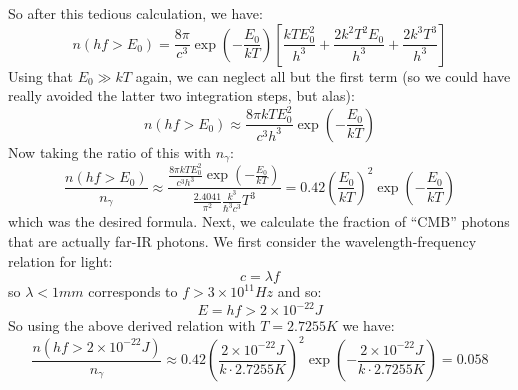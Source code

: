 So after this tedious calculation, we have:
\begin{equation}
  n(hf > E_0) = \frac{8\pi}{c^3}\exp(-\frac{E_0}{kT})\left[\frac{kTE_0^2}{h^3} + \frac{2k^2T^2E_0}{h^3} + \frac{2k^3T^3}{h^3}\right]
\end{equation}
Using that $E_0 \gg kT$ again, we can neglect all but the first term (so we could have really avoided the latter two integration steps, but alas):
\begin{equation}
  n(hf > E_0) \approx \frac{8\pi kTE_0^2}{c^3h^3}\exp(-\frac{E_0}{kT})
\end{equation}
Now taking the ratio of this with $n_\gamma$:
\begin{equation}
  \boxed{\frac{n(hf > E_0)}{n_\gamma} \approx \frac{\frac{8\pi kTE_0^2}{c^3h^3}\exp(-\frac{E_0}{kT})}{\frac{2.4041}{\pi^2}\frac{k^3}{\hbar^3c^3}T^3} = 0.42\left(\frac{E_0}{kT}\right)^2\exp(-\frac{E_0}{kT})}
\end{equation}
which was the desired formula. Next, we calculate the fraction of ``CMB'' photons that are actually far-IR photons. We first consider the wavelength-frequency relation for light:
\begin{equation}
  c = \lambda f
\end{equation}
so $\lambda < 1\si{mm}$ corresponds to $f > 3 \times 10^{11}\si{Hz}$ and so:
\begin{equation}
  E = hf > 2 \times 10^{-22}\si{J}
\end{equation}
So using the above derived relation with $T = 2.7255\si{K}$ we have:
\begin{equation}
  \boxed{\frac{n(hf > 2 \times 10^{-22}\si{J})}{n_\gamma} \approx 0.42\left(\frac{2 \times 10^{-22}\si{J}}{k\cdot 2.7255\si{K}}\right)^2\exp(-\frac{2 \times 10^{-22}\si{J}}{k\cdot 2.7255\si{K}}) = 0.058}
\end{equation}



